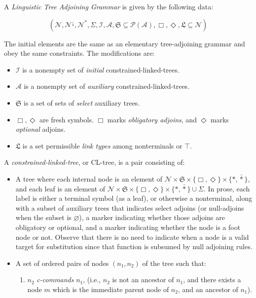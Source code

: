 \begin{myboxB}
\begin{multicols}{2}
\begin{defn} A \emph{Linguistic Tree Adjoining Grammar} is given by the following data:

\[(\mathcal{N}, \mathcal{N}^\downarrow, \mathcal{N}^*, \Sigma, \mathcal{I}, \mathcal{A}, \mathfrak{S} \subseteq \mathcal{P}(\mathcal{A}), \Box, \Diamond, \mathfrak{L} \subseteq \mathcal{N})\]

The initial elements are the same as an elementary tree-adjoining grammar and obey the same constraints. The modifications are:

\begin{itemize}
\item{$\mathcal{I}$ is a nonempty set of \emph{initial} constrained-linked-trees.}
\item{$\mathcal{A}$ is a nonempty set of \emph{auxiliary} constrained-linked-trees.}
\item{$\mathfrak{S}$ is a set of sets of \emph{select} auxiliary trees.}
\item{$\Box, \Diamond$ are fresh symbols. $\Box$ marks \emph{obligatory adjoins}, and $\Diamond$ marks \emph{optional} adjoins.}
\item{$\mathfrak{L}$ is a set permissible \emph{link types} among nonterminals or $\top$.}
\end{itemize}
A \emph{constrained-linked-tree}, or CL-tree, is a pair consisting of:
\begin{itemize}
\item{A tree where each internal node is an element of $\mathcal{N} \times \mathfrak{S} \times \{\Box,\Diamond\} \times \{*, \bar{*}\}$, and each leaf is an element of $\mathcal{N} \times \mathfrak{S} \times \{\Box,\Diamond\} \times \{*, \bar{*}\} \cup \Sigma$. In prose, each label is either a terminal symbol (as a leaf), or otherwise a nonterminal, along with a subset of auxiliary trees that indicates select adjoins (or null-adjoins when the subset is $\varnothing$), a marker indicating whether those adjoins are obligatory or optional, and a marker indicating whether the node is a foot node or not. Observe that there is no need to indicate when a node is a valid target for substitution since that function is subsumed by null adjoining rules.}
\item{
A set of ordered pairs of nodes $(n_1,n_2)$ of the tree such that:
\begin{enumerate}
\item{$n_2$ \emph{c-commands} $n_1$, (i.e., $n_2$ is not an ancestor of $n_1$, and there exists a node $m$ which is the immediate parent node of $n_2$, and an ancestor of $n_1$).}

\end{enumerate}}
\end{itemize}
\end{defn}
\end{multicols}
\end{myboxB}
